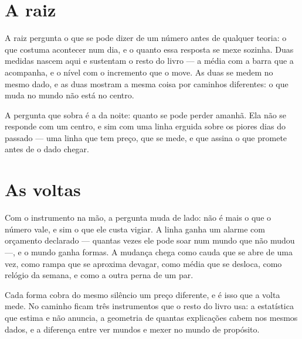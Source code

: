 \documentclass[12pt]{book}
\theoremstyle{definition}
\theoremstyle{remark}
\begin{document}
\part{A raiz}

A raiz pergunta o que se pode dizer de um número antes de qualquer teoria: o que costuma
acontecer num dia, e o quanto essa resposta se mexe sozinha. Duas medidas nascem aqui e
sustentam o resto do livro --- a média com a barra que a acompanha, e o nível com o incremento
que o move. As duas se medem no mesmo dado, e as duas mostram a mesma coisa por caminhos
diferentes: o que muda no mundo não está no centro.

A pergunta que sobra é a da noite: quanto se pode perder amanhã. Ela não se responde com um
centro, e sim com uma linha erguida sobre os piores dias do passado --- uma linha que tem preço,
que se mede, e que assina o que promete antes de o dado chegar.




\part{As voltas}

Com o instrumento na mão, a pergunta muda de lado: não é mais o que o número vale, e sim
o que ele custa vigiar. A linha ganha um alarme com orçamento declarado --- quantas vezes ele
pode soar num mundo que não mudou ---, e o mundo ganha formas. A mudança chega como cauda que se
abre de uma vez, como rampa que se aproxima devagar, como média que se desloca, como relógio da
semana, e como a outra perna de um par.

Cada forma cobra do mesmo silêncio um preço diferente, e é isso que a volta mede. No caminho
ficam três instrumentos que o resto do livro usa: a estatística que estima e não anuncia, a
geometria de quantas explicações cabem nos mesmos dados, e a diferença entre ver mundos e mexer
no mundo de propósito.








\end{document}
